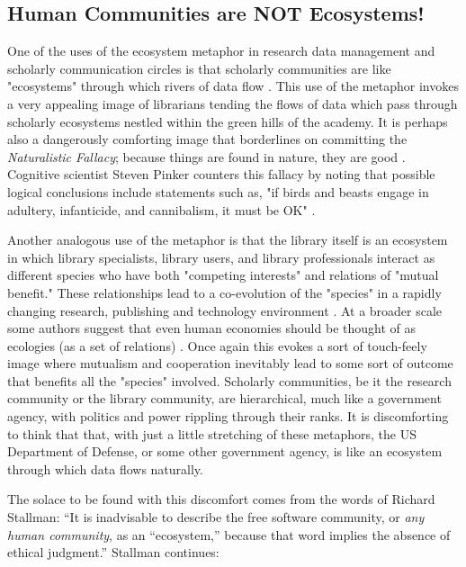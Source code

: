 \subsection{Human Communities are NOT Ecosystems!}

One of the uses of the ecosystem metaphor in research data management and scholarly communication circles is that scholarly communities are like "ecosystems" through which rivers of data flow \citep{choudhury_2010}. This use of the metaphor invokes a very appealing image of librarians tending the flows of data which pass through scholarly ecosystems nestled within the green hills of the academy. It is perhaps also a dangerously comforting image that borderlines on committing the \textit{Naturalistic Fallacy}; because things are found in nature, they are good \citep[see][p. 68 for a similar example in business management]{lucas_2012}. Cognitive scientist Steven Pinker counters this fallacy by noting that possible logical conclusions include statements such as, "if birds and beasts engage in adultery, infanticide, and cannibalism, it must be OK" \citep{pinker_2002}. 

Another analogous use of the metaphor is that the library itself is an ecosystem in which library specialists, library users, and library professionals interact as different species who have both "competing interests" and relations of "mutual benefit." These relationships lead to a co-evolution of the "species" in a rapidly changing research, publishing and technology environment \citep{walter_2008}. At a broader scale some authors suggest that even human economies should be thought of as ecologies (as a set of relations) \citep[][p. 72]{lucas_2012}. Once again this evokes a sort of touch-feely image where mutualism and cooperation inevitably lead to some sort of outcome that benefits all the "species" involved. Scholarly communities, be it the research community or the library community, are hierarchical, much like a government agency, with politics and power rippling through their ranks. It is discomforting to think that that, with just a little stretching of these metaphors, the US Department of Defense, or some other government agency, is like an ecosystem through which data flows naturally. 

The solace to be found with this discomfort comes from the words of Richard Stallman: “It is inadvisable to describe the free software community, or \textit{any human community}, as an “ecosystem,” because that word implies the absence of ethical judgment.”  Stallman continues:
 
